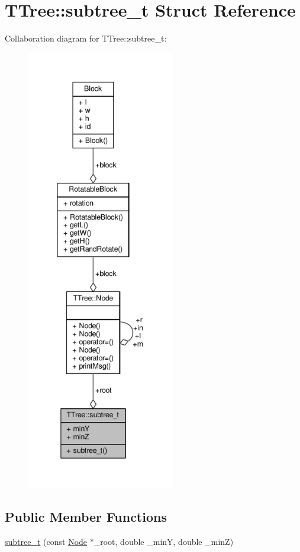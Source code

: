 \hypertarget{structTTree_1_1subtree__t}{}\section{T\+Tree\+:\+:subtree\+\_\+t Struct Reference}
\label{structTTree_1_1subtree__t}


Collaboration diagram for T\+Tree\+:\+:subtree\+\_\+t\+:
\nopagebreak
\begin{figure}[H]
\begin{center}
\leavevmode
\includegraphics[height=550pt]{structTTree_1_1subtree__t__coll__graph}
\end{center}
\end{figure}
\subsection*{Public Member Functions}
\begin{DoxyCompactItemize}
\item 
\hyperlink{structTTree_1_1subtree__t_a39ba129f04bbc5c14f61e4055c575f34}{subtree\+\_\+t} (const \hyperlink{structTTree_1_1Node}{Node} $\ast$\+\_\+root, double \+\_\+min\+Y, double \+\_\+min\+Z)
\end{DoxyCompactItemize}
